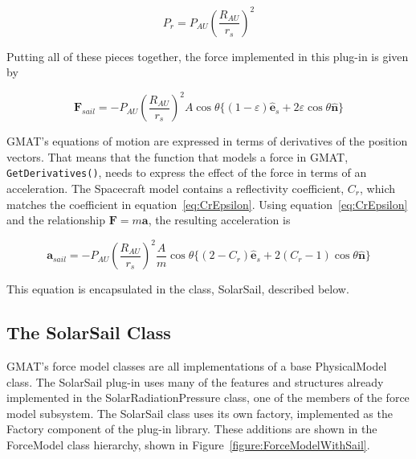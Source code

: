 \documentclass[letterpaper,10pt]{article}
\begin{document}
\begin{equation}
P_r = P_{AU} \left(\frac{R_{AU}}{r_s}\right)^2
\end{equation}

Putting all of these pieces together, the force implemented in this plug-in is given by

\begin{equation}
\textbf{F}_{sail} = -P_{AU} \left(\frac{R_{AU}}{r_s}\right)^2 A \cos\theta \{(1 -
\varepsilon) \hat{\textbf{e}}_s + 2 \varepsilon \cos\theta \hat{\textbf{n}}\}
\end{equation}

GMAT's equations of motion are expressed in terms of derivatives of the position vectors.  That
means that the function that models a force in GMAT, \texttt{GetDerivatives()}, needs to express
the effect of the force in terms of an acceleration.  The Spacecraft model contains a reflectivity
coefficient, $C_r$, which matches the coefficient in equation~\ref{eq:CrEpsilon}.  Using
equation~\ref{eq:CrEpsilon} and the relationship $\textbf{F} = m\textbf{a}$, the resulting
acceleration is

\begin{equation}
\textbf{a}_{sail} = -P_{AU} \left(\frac{R_{AU}}{r_s}\right)^2 \frac{A}{m} \cos\theta \{(2 -
C_r) \hat{\textbf{e}}_s + 2 (C_r - 1) \cos\theta \hat{\textbf{n}}\}
\end{equation}

\noindent This equation is encapsulated in the class, SolarSail, described below.

\subsection{The SolarSail Class}

GMAT's force model classes are all implementations of a base PhysicalModel class.  The SolarSail
plug-in uses many of the features and structures already implemented in the SolarRadiationPressure
class, one of the members of the force model subsystem.  The SolarSail class uses its own factory,
implemented as the Factory component of the plug-in library.  These additions are shown in the
ForceModel class hierarchy, shown in Figure~\ref{figure:ForceModelWithSail}.
\end{document}
